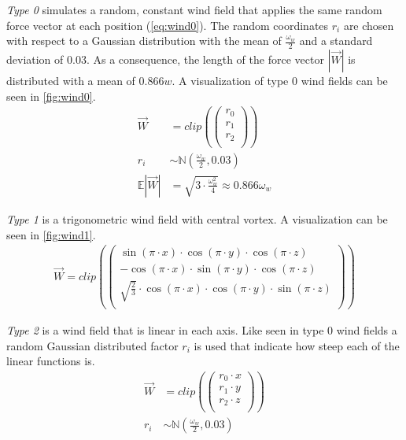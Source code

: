 \newline
\emph{Type 0} simulates a random, constant wind field that applies the same random force vector at each position (\cref{eq:wind0}). The random coordinates $r_i$ are chosen with respect to a Gaussian distribution with the mean of $\frac{\omega_w}{2}$ and a standard deviation of $0.03$. As a consequence, the length of the force vector $|\overrightarrow{W}|$ is distributed with a mean of $0.866w$. A visualization of type 0 wind fields can be seen in \cref{fig:wind0}.
\begin{align} \label{eq:wind0}
	\overrightarrow{W} &= clip(\left(
	\begin{array}{c}
		r_0\\
		r_1\\
		r_2\\
	\end{array}
	\right))\\
	r_i &\sim \mathbb{N}(\frac{\omega_w}{2}, 0.03)\\
	\mathbb{E}|\overrightarrow{W}| &= \sqrt{3 \cdot \frac{\omega_w^2}{4}} \approx 0.866 \omega_w
\end{align}

\newpage

\emph{Type 1} is a trigonometric wind field with central vortex. A visualization can be seen in \cref{fig:wind1}.
\begin{align} \label{eq:wind1}
	\overrightarrow{W} = clip(\left(
	\begin{array}{c}
		\sin(\pi \cdot x) \cdot \cos(\pi \cdot y) \cdot \cos(\pi \cdot z)\\
		- \cos(\pi \cdot x) \cdot \sin(\pi \cdot y) \cdot \cos(\pi \cdot z)\\
		\sqrt{\frac{2}{3}} \cdot \cos(\pi \cdot x) \cdot \cos(
		\pi \cdot y) \cdot \sin(\pi \cdot z)\\
	\end{array}
	\right))
\end{align}
\newline

\emph{Type 2} is a wind field that is linear in each axis. Like seen in type 0 wind fields a random Gaussian distributed factor $r_i$ is used that indicate how steep each of the linear functions is.
\begin{align}
	\overrightarrow{W} &= clip(\left(
	\begin{array}{c}
		r_0 \cdot x\\
		r_1 \cdot y\\
		r_2 \cdot z\\
	\end{array}
	\right))\\
	r_i &\sim \mathbb{N}(\frac{\omega_w}{2}, 0.03)
\end{align}
\newline

